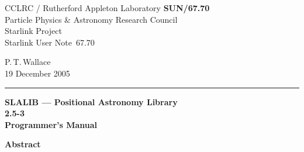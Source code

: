 \documentclass[11pt,twoside]{article}
\newcommand{\stardoccategory}  {Starlink User Note}
\newcommand{\stardocinitials}  {SUN}
\newcommand{\stardocnumber}    {67.70}
\newcommand{\stardocauthors}   {P.\,T.\,Wallace}
\newcommand{\stardocdate}      {19 December 2005}
\newcommand{\stardoctitle}     {SLALIB --- Positional Astronomy Library}
\newcommand{\stardocversion}   {2.5-3}
\newcommand{\stardocmanual}    {Programmer's Manual}
\newcommand{\stardocname}{\stardocinitials /\stardocnumber}
\newenvironment{latexonly}{}{}
\begin{document}
\thispagestyle{empty}

\begin{latexonly}
   CCLRC / {\sc Rutherford Appleton Laboratory} \hfill {\bf \stardocname}\\
   {\large Particle Physics \& Astronomy Research Council}\\
   {\large Starlink Project\\}
   {\large \stardoccategory\ \stardocnumber}
   \begin{flushright}
   \stardocauthors\\
   \stardocdate
   \end{flushright}
   \vspace{-4mm}
   \rule{\textwidth}{0.5mm}
   \vspace{5mm}
   \begin{center}
   {\Huge\bf  \stardoctitle \\ [2.5ex]}
   {\LARGE\bf \stardocversion \\ [4ex]}
   {\Huge\bf  \stardocmanual}
   \end{center}
   \vspace{5mm}

   \vspace{10mm}
   \begin{center}
      {\Large\bf Abstract}
   \end{center}
\end{latexonly}
\end{document}
